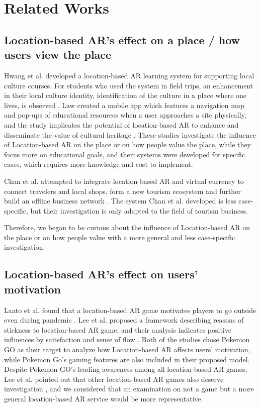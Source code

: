 \chapter{Related Works} \label{ch:3}

\section{Location-based AR's effect on a place / how users view the place}
Hwang et al. developed a location-based AR learning system for supporting local culture courses.
For students who used the system in field trips, an enhancement in their local culture identity,
identification of the culture in a place where one lives, is observed \cite{hwang_chang_chen_chen_2017}.
Law created a mobile app which features a navigation map and pop-ups of educational resources when a user approaches a site physically,
and the study implicates the potential of location-based AR to enhance and disseminate the value of cultural heritage \cite{law_2018}.
These studies investigate the influence of Location-based AR on the place or on how people value the place,
while they focus more on educational goals, and their systems were developed for specific cases, which requires more knowledge and cost to implement.

Chan et al. attempted to integrate location-based AR and virtual currency to connect travelers and local shops,
form a new tourism ecosystem and further build an offline business network \cite{chan_lin_wang_lu_hsu_2017}.
The system Chan et al. developed is less case-specific, but their investigation is only adapted to the field of tourism business.

Therefore, we began to be curious about the influence of Location-based AR on the place or on how people value with a more general and less case-specific investigation.

\section{Location-based AR's effect on users' motivation}
Laato et al. found that a location-based AR game motivates players to go outside even during pandemic \cite{laato_islam_laine_2020}.
Lee et al. proposed a framework describing reasons of stickness to location-based AR game,
and their analysis indicates positive influences by satisfaction and sense of flow \cite{lee_chiang_hsiao_2018}.
Both of the studies chose Pokemon GO as their target to analyze how Location-based AR affects users' motivation,
while Pokemon Go's gaming features are also included in their proposed model.
Despite Pokemon GO's leading awareness among all location-based AR games,
Lee et al. pointed out that other location-based AR games also deserve investigation \cite{lee_chiang_hsiao_2018},
and we considered that an examination on not a game but a more general location-based AR service would be more representative.

